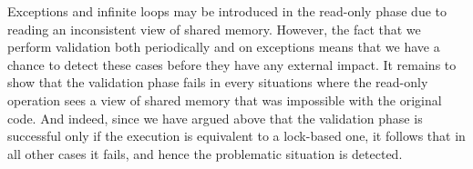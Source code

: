 Exceptions and infinite loops may be introduced in the read-only phase due to reading an inconsistent view of shared memory.
However, the fact that we perform validation both periodically and on exceptions means that we have a chance to detect these cases before they have any external impact. It remains to show that the validation phase fails in every situations where the read-only operation sees a view of shared memory that was impossible with the original code. And indeed, since we have argued above that the validation phase is successful only if the execution is equivalent to a lock-based one, it follows that in all other cases it fails, and hence the problematic situation is detected.
